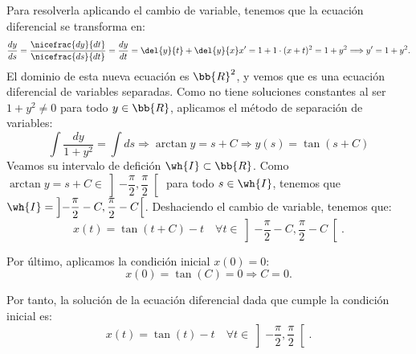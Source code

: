 \documentclass[12pt]{article}
\begin{document}
\begin{ejercicio}
    Para resolverla aplicando el cambio de variable, tenemos que la ecuación diferencial se transforma en:
    \begin{equation*}
        \dfrac{dy}{ds} = \dfrac{\nicefrac{dy}{dt}}{\nicefrac{ds}{dt}} = \dfrac{dy}{dt} = \del{y}{t} + \del{y}{x}x' = 1 + 1\cdot (x+t)^2 = 1 + y^2
        \Longrightarrow y'=1+y^2.
    \end{equation*}
    El dominio de esta nueva ecuación es $\bb{R}^2$, y vemos que es una ecuación diferencial de variables separadas.
    Como no tiene soluciones constantes al ser $1+y^2\neq 0$ para todo $y\in \bb{R}$, aplicamos el método de separación de variables:
    \begin{equation*}
        \int \dfrac{dy}{1+y^2} = \int ds \Longrightarrow \arctan y = s + C
        \Longrightarrow y(s) = \tan(s+C)
    \end{equation*}
    Veamos su intervalo de defición $\wh{I}\subset \bb{R}$. Como $\arctan y=s+C\in \left]-\dfrac{\pi}{2}, \dfrac{\pi}{2}\right[$ para todo $s\in \wh{I}$, tenemos que
    $\wh{I}=\left]-\dfrac{\pi}{2}-C, \dfrac{\pi}{2}-C\right[$. Deshaciendo el cambio de variable, tenemos que:
    \begin{equation*}
        x(t) = \tan(t+C)-t \quad \forall t\in \left]-\dfrac{\pi}{2}-C, \dfrac{\pi}{2}-C\right[.
    \end{equation*}

    Por último, aplicamos la condición inicial $x(0)=0$:
    \begin{equation*}
        x(0) = \tan(C) = 0 \Longrightarrow C = 0.
    \end{equation*}

    Por tanto, la solución de la ecuación diferencial dada que cumple la condición inicial es:
    \begin{equation*}
        x(t) = \tan(t)-t \quad \forall t\in \left]-\dfrac{\pi}{2}, \dfrac{\pi}{2}\right[.
    \end{equation*}
\end{ejercicio}
\end{document}
